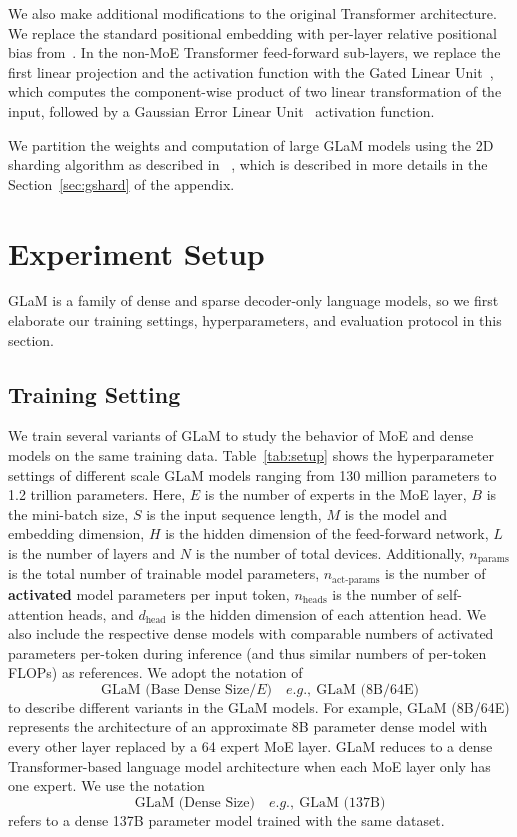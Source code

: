 We also make additional modifications to the original Transformer architecture. We replace the standard positional embedding with per-layer relative positional bias from~\citet{daiyan2019}. In the non-MoE Transformer feed-forward sub-layers, we replace the first linear projection and the activation function with the Gated  Linear Unit~\cite{dauphin2017language, shazeer2020glu}, which computes the component-wise product of two linear transformation of the input, followed by a Gaussian Error Linear Unit~\cite{hendrycks2016bridging} activation function. 

We partition the weights and computation of large GLaM models using the 2D sharding algorithm as described in ~\citet{xu2021gspmd}, which is described in more details in the Section~\ref{sec:gshard} of the appendix.

\section{Experiment Setup}
\label{sec:exp}
GLaM is a family of dense and sparse decoder-only language models, so we first elaborate our training settings, hyperparameters, and evaluation protocol in this section.
\subsection{Training Setting}
\label{sec:exp_setup}

We train several variants of GLaM to study the behavior of MoE and dense models on the same training data. Table~\ref{tab:setup} shows the hyperparameter settings of different scale GLaM models ranging from 130 million parameters to 1.2 trillion parameters. Here, $E$ is the number of experts in the MoE layer, $B$ is the mini-batch size, $S$ is the input sequence length, $M$ is the model and embedding dimension, $H$ is the hidden dimension of the feed-forward network, $L$ is the number of layers and $N$ is the number of total devices. Additionally,  $n_{\text{params}}$ is the total number of trainable model parameters, $n_{\text{act-params}}$ is the number of \textbf{activated} model parameters per input token, $n_{\text{heads}}$ is the number of self-attention heads, and $d_{\text{head}}$ is the hidden dimension of each attention head. We also include the respective dense models with comparable numbers of activated parameters per-token during inference (and thus similar numbers of per-token FLOPs) as references. We adopt the notation of $$
\text{GLaM (Base Dense Size} / E)  \quad e.g.,~ \text{GLaM (}8\text{B}/64\text{E)}
$$
to describe different variants in the GLaM models. For example, GLaM (8B/64E) represents the architecture of an approximate 8B parameter dense model with every other layer replaced by a 64 expert MoE layer. GLaM reduces to a dense Transformer-based language model architecture when each MoE layer only has one expert. We use the notation $$\text{GLaM (Dense Size})  \quad e.g.,~ \text{GLaM (137B)}$$ refers to a dense 137B parameter model trained with the same dataset.

